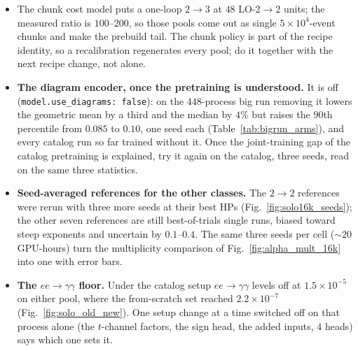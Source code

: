 \documentclass[11pt]{article}
\newcommand{\code}[1]{\texttt{#1}}
\begin{document}
\begin{itemize}
    sweep's best HPs; \code{analysis/catalog\_v2/seed\_arms.py} is the read-out.
    Three $2\to4$ pools with neutrino pairs ($ee\to u\bar u\nu\bar\nu$, $ee\to d\bar d\nu\bar\nu$,
    $ee\to\nu\bar\nu\nu\bar\nu$) have numerically unstable outputs early in training
    (Sec.~\ref{sec:throughput}); worth a look as a struggler pattern. (d) The arithmetic mean diverged once on the
    small pools (non-finite gradient); one seed, undiagnosed. (e) Any comparison between arms finer than about $25\%$ needs
    repeats: the best arithmetic-mean trial rerun at its own HPs and seed ended at $0.068$
    against the trial's $0.054$ (GPU nondeterminism at $500$ steps), so three repeats per
    arm before the next A/B.
  \item The chunk cost model puts a one-loop $2\to3$ at $48$ LO-$2\to2$ units; the measured
    ratio is $100$--$200$, so those pools come out as single $5\times10^4$-event chunks and
    make the prebuild tail. The chunk policy is part of the recipe identity, so a recalibration
    regenerates every pool; do it together with the next recipe change, not alone.
  \item \textbf{The diagram encoder, once the pretraining is understood.} It is off
    (\code{model.use\_diagrams: false}): on the $448$-process big run removing it lowers the
    geometric mean by a third and the median by $4\%$ but raises the $90$th percentile from
    $0.085$ to $0.10$, one seed each (Table~\ref{tab:bigrun_arms}), and every catalog run so far
    trained without it. Once the joint-training gap of the catalog pretraining is explained,
    try it again on the catalog, three seeds, read on the same three statistics.
  \item \textbf{Seed-averaged references for the other classes.} The $2\to2$ references were
    rerun with three more seeds at their best HPs (Fig.~\ref{fig:solo16k_seeds}); the other seven
    references are still best-of-trials single runs, biased toward steep exponents and uncertain by
    $0.1$--$0.4$. The same three seeds per cell ($\sim20$ GPU-hours) turn the multiplicity comparison
    of Fig.~\ref{fig:alpha_mult_16k} into one with error bars.
  \item \textbf{The $ee\to\gamma\gamma$ floor.} Under the catalog setup $ee\to\gamma\gamma$ levels
    off at $1.5\times10^{-5}$ on either pool, where the from-scratch set reached $2.2\times10^{-7}$
    (Fig.~\ref{fig:solo_old_new}). One setup change at a time switched off on that process alone
    (the $t$-channel factors, the sign head, the added inputs, $4$ heads) says which one sets it.
\end{itemize}
\end{document}
